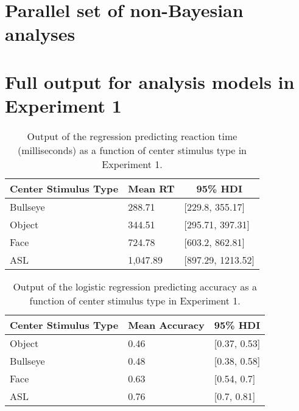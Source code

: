 \documentclass[,man,floatsintext]{apa6}
\begin{document}
\begin{appendix}
\hypertarget{parallel-set-of-non-bayesian-analyses}{%
\section{Parallel set of non-Bayesian
analyses}\label{parallel-set-of-non-bayesian-analyses}}

\hypertarget{full-output-for-analysis-models-in-experiment-1}{%
\section{Full output for analysis models in Experiment
1}\label{full-output-for-analysis-models-in-experiment-1}}

\begin{table}[h]
\begin{center}
\begin{threeparttable}
\caption{\label{tab:trio-rt-model}Output of the regression predicting reaction time (milliseconds) as a function of center stimulus type in Experiment 1.}
\begin{tabular}{lll}
\toprule
Center Stimulus Type & \multicolumn{1}{c}{Mean RT} & \multicolumn{1}{c}{95\% HDI}\\
\midrule
Bullseye & 288.71 & [229.8, 355.17]\\
Object & 344.51 & [295.71, 397.31]\\
Face & 724.78 & [603.2, 862.81]\\
ASL & 1,047.89 & [897.29, 1213.52]\\
\bottomrule
\end{tabular}
\end{threeparttable}
\end{center}
\end{table}

\begin{table}[h]
\begin{center}
\begin{threeparttable}
\caption{\label{tab:trio-acc-model}Output of the logistic regression predicting accuracy as a function of center stimulus type in Experiment 1.}
\begin{tabular}{lll}
\toprule
Center Stimulus Type & \multicolumn{1}{c}{Mean Accuracy} & \multicolumn{1}{c}{95\% HDI}\\
\midrule
Object & 0.46 & [0.37, 0.53]\\
Bullseye & 0.48 & [0.38, 0.58]\\
Face & 0.63 & [0.54, 0.7]\\
ASL & 0.76 & [0.7, 0.81]\\
\bottomrule
\end{tabular}
\end{threeparttable}
\end{center}
\end{table}


\end{appendix}
\end{document}
